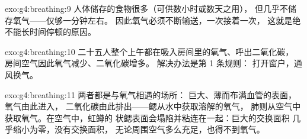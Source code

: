 \begin{solution}{exo:g4:breathing:9}
人体储存的食物很多（可供数小时或数天之用），
但几乎不储存氧气——仅够一分钟左右。
因此氧气必须不断输送，一次接着一次，
这就是绝不能长时间停顿的原因。
\end{solution}

\begin{solution}{exo:g4:breathing:10}
二十五人整个上午都在吸入房间里的氧气、呼出二氧化碳，
房间空气因此氧气减少、二氧化碳增多。
解决办法是第 1 条规则：
打开窗户，通风换气。
\end{solution}

\begin{solution}{exo:g4:breathing:11}
两者都是与氧气相遇的场所：
巨大、薄而布满血管的表面，氧气由此进入，
二氧化碳由此排出——鳃从水中获取溶解的氧气，
肺则从空气中获取氧气。在空气中，虹鳟的
状鳃表面会塌陷并粘连在一起：巨大的交换面积
几乎缩小为零，没有交换面积，
无论周围空气多么充足，也得不到氧气。
\end{solution}
